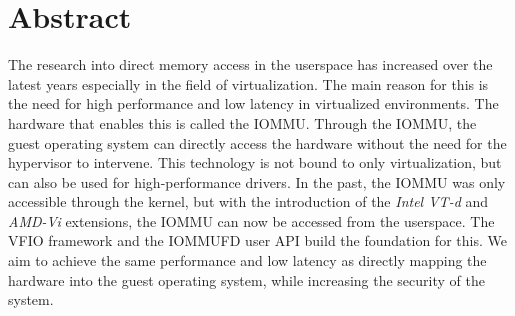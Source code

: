 \chapter{Abstract}

The research into direct memory access in the userspace has increased over the latest years especially in the field of virtualization.
The main reason for this is the need for high performance and low latency in virtualized environments.
The hardware that enables this is called the IOMMU. Through the IOMMU, the guest operating system can directly access the hardware without the need for the hypervisor to intervene.
This technology is not bound to only virtualization, but can also be used for high-performance drivers.
In the past, the IOMMU was only accessible through the kernel, but with the introduction of the \textit{Intel VT-d} and \textit{AMD-Vi} extensions, the IOMMU can now be accessed from the userspace.
The VFIO framework and the IOMMUFD user API build the foundation for this.
We aim to achieve the same performance and low latency as directly mapping the hardware into the guest operating system, while increasing the security of the system.